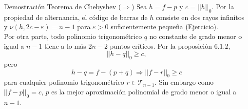 \documentclass{beamer}
\newcounter{Ejercicio}
\begin{document}
\begin{frame}{Demostraci\'on Teorema de Chebyshev ($\Rightarrow$)}
Sea $h=f-p$ y $c=||h||_0$. Por la propiedad de alternancia, el c\'odigo de barras de $h$  consiste en dos rayos infinitos y $\nu(h,2c-\varepsilon)=n-1$ para $\varepsilon>0$ suficientemente peque\~na (Ejercicio). \\
\vspace{1em}
Por otra parte, todo polinomio trigonom\'etrico $q$ no constante de grado menor o igual a $n-1$ tiene a lo m\'as $2n-2$ puntos cr\'iticos. Por la proposici\'on 6.1.2, $$||h-q||_0\geq c,$$ pero $$h-q=f-(p+q)\Rightarrow ||f-r||_0\geq c$$ para cualquier polinomio trigonom\'etrico $r\in \mathcal{T}_{n-1}$. Sin embargo como $||f-p||_0=c$, $p$ es la mejor aproximaci\'on polinomial de grado menor o igual a $n-1$.
\end{frame}
\end{document}
